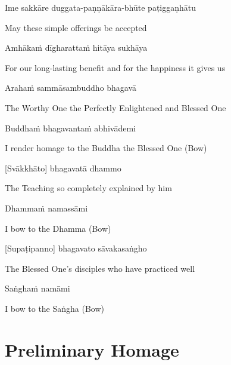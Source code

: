Ime sakkāre duggata-paṇṇākāra-bhūte paṭiggaṇhātu

\begin{cprenglish}
  May these simple offerings be accepted
\end{cprenglish}

Amhākaṁ dīgharattaṁ hitāya sukhāya

\begin{cprenglish}
  For our long-lasting benefit and for the happiness it gives us
\end{cprenglish}

Arahaṁ sammāsambuddho bhagavā

\begin{cprenglish}
  The Worthy One the Perfectly Enlightened and Blessed One
\end{cprenglish}

Buddhaṁ bhagavantaṁ abhivādemi\relax

\begin{cprenglish}
  I render homage to the Buddha the Blessed One (Bow)
\end{cprenglish}

[Svākkhāto] bhagavatā dhammo

\begin{cprenglish}
  The Teaching so completely explained by him
\end{cprenglish}

Dhammaṁ namassāmi\relax

\begin{cprenglish}
  I bow to the Dhamma (Bow)
\end{cprenglish}

[Supaṭipanno] bhagavato sāvakasaṅgho

\begin{cprenglish}
  The Blessed One’s disciples who have practiced well
\end{cprenglish}

Saṅghaṁ namāmi

\begin{cprenglish}
  I bow to the Saṅgha (Bow)
\end{cprenglish}

\section{Preliminary Homage}

\begin{leader}
\end{leader}

